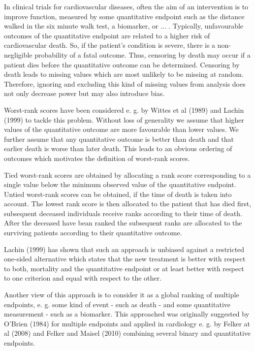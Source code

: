 \documentclass[bimj,fleqn]{w-art}\usepackage[]{graphicx}\usepackage[]{color}
\theoremstyle{plain}
\theoremstyle{definition}
\begin{document}
  In clinical trials for cardiovascular diseases, often the aim of an
  intervention is to improve function, measured by some quantitative endpoint
  such as the distance walked in the six minute walk test, a biomarker, or ... .
  Typically, unfavourable outcomes of the quantitative endpoint are related to a
  higher risk of cardiovascular death. So, if the patient's condition is severe,
  there is a non-negligible probability of a fatal outcome. Thus, censoring by
  death may occur if a patient dies before the quantitative outcome can be
  determined. Censoring by death leads to missing values which are most unlikely
  to be missing at random. Therefore, ignoring and excluding this kind of
  missing values from analysis does not only decrease power but may also
  introduce bias.

  Worst-rank scores have been considered e. g. by Wittes et al (1989) and Lachin
  (1999) to tackle this problem. Without loss of generality we assume that
  higher values of the quantitative outcome are more favourable than lower
  values. We further assume that any quantitative outcome is better than death
  and that earlier death is worse than later death. This leads to an obvious
  ordering of outcomes which motivates the definition of worst-rank scores.

  Tied worst-rank scores are obtained by allocating a rank score corresponding
  to a single value below the minimum observed value of the quantitative
  endpoint. Untied worst-rank scores can be obtained, if the time of death is
  taken into account. The lowest rank score is then allocated to the patient
  that has died first, subsequent deceased individuals receive ranks according
  to their time of death. After the deceased have bean ranked the subsequent
  ranks are allocated to the surviving patients according to their quantitative
  outcome.

  Lachin (1999) has shown that such an approach is unbiased against a restricted
  one-sided alternative which states that the new treatment is better with
  respect to both, mortality and the quantitative endpoint or at least better
  with respect to one criterion and equal with respect to the other.

  Another view of this approach is to consider it as a global ranking of
  multiple endpoints, e. g. some kind of event - such as death - and some
  quantitative measurement - such as a biomarker. This approached was originally
  suggested by O'Brien (1984) for multiple endpoints and applied in cardiology
  e. g. by Felker at al (2008) and Felker and Maisel (2010) combining several
  binary and quantitative endpoints.
\end{document}
